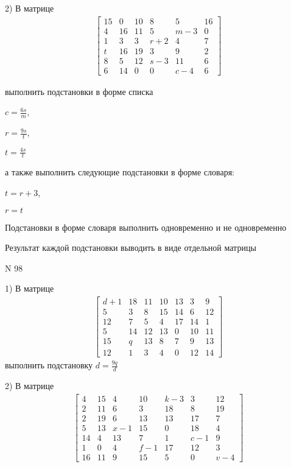 \documentclass[11pt]{report}
\begin{document}
    2) В матрице
\begin{align*}
\left[\begin{matrix}15 & 0 & 10 & 8 & 5 & 16\\4 & 16 & 11 & 5 & m - 3 & 0\\1 & 3 & 3 & r + 2 & 4 & 7\\t & 16 & 19 & 3 & 9 & 2\\8 & 5 & 12 & s - 3 & 11 & 6\\6 & 14 & 0 & 0 & c - 4 & 6\end{matrix}\right]
\end{align*}

выполнить подстановки в форме списка

$c=\frac{6 s}{m}$,

$r=\frac{9 s}{t}$,

$t=\frac{4 s}{t}$

а также выполнить следующие подстановки в форме словаря:

$t=r + 3$,

$r=t$


    Подстановки в форме словаря выполнить одновременно и не одновременно


    Результат каждой подстановки выводить в виде отдельной матрицы

\newpage
N 98


    1) В матрице
\begin{align*}
\left[\begin{matrix}d + 1 & 18 & 11 & 10 & 13 & 3 & 9\\5 & 3 & 8 & 15 & 14 & 6 & 12\\12 & 7 & 5 & 4 & 17 & 14 & 1\\5 & 14 & 12 & 13 & 0 & 10 & 11\\15 & q & 13 & 8 & 7 & 9 & 13\\12 & 1 & 3 & 4 & 0 & 12 & 14\end{matrix}\right]
\end{align*}
выполнить подстановку $d=\frac{9 q}{d}$


    2) В матрице
\begin{align*}
\left[\begin{matrix}4 & 15 & 4 & 10 & k - 3 & 3 & 12\\2 & 11 & 6 & 3 & 18 & 8 & 19\\2 & 19 & 6 & 13 & 13 & 17 & 7\\5 & 13 & x - 1 & 15 & 0 & 18 & 4\\14 & 4 & 13 & 7 & 1 & c - 1 & 9\\1 & 0 & 4 & f - 1 & 17 & 12 & 3\\16 & 11 & 9 & 15 & 5 & 0 & v - 4\end{matrix}\right]
\end{align*}
\end{document}
